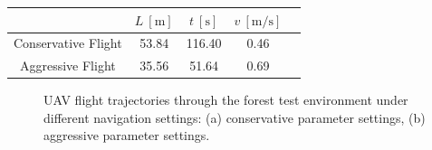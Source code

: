             \begin{table}[H]
                \centering
                \renewcommand{\arraystretch}{1.2}
                \begin{tabular}{|c|c|c|c|c|}
                \hline
                                    & \( L \ [\mathrm{m}] \) & \( t \ [\mathrm{s}] \) &  \( v \ [\mathrm{m/s}] \)     \\ \hline
                Conservative Flight & 53.84                   & 116.40                  &  0.46                          \\ \hline
                Aggressive Flight    & 35.56                   &  51.64                  &  0.69                          \\ \hline
                \end{tabular}
            \end{table}

            \begin{figure}[H]
                \centering
                \caption{
                    \ac{UAV} flight trajectories through the forest test environment under different navigation settings: (a) conservative parameter settings, (b) aggressive parameter settings.
                }
                \label{fig:rbl_forest_conservative_flight_path}
            \end{figure}

